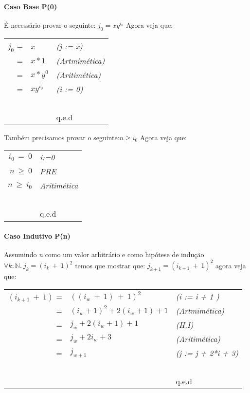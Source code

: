 \paragraph{Caso Base P(0)}
É necessário provar o seguinte: $ j_0 =xy^{i_0} $ Agora veja que:
 \begin{center}
     \begin{tabular}{rll}
         \emph{$j_0$} =& \emph{x} & \emph{(j := x)} \\
                      =& \emph{$x*1$}& \emph{(Artmimética)}\\ 
                      =& \emph{$x*y^0$}& \emph{(Aritimética)}\\        
                      =& \emph{$xy^{i_0}$}& \emph{(i := 0)}\\ 
         ~&~&~\\
         ~&~&q.e.d\\
     \end{tabular}
 \end{center}
Também precisamos provar o seguinte:$n \geq i_0$ Agora veja que:
 \begin{center}
     \begin{tabular}{rl}
         \emph{$i_0\ =\ 0$}& \emph{i:=0} \\
         \emph{$n\ \geq\ 0$}& \emph{PRE} \\
         \emph{$n\ \geq\ i_0$}& \emph{Aritimética} \\
         ~&~\\
         ~&q.e.d\\
     \end{tabular}
 \end{center}

\paragraph{Caso Indutivo P(n)}
Assumindo \emph{n} como um valor arbitrário e como hipótese de indução
$\forall k :\mathbb{N} .\ j_k=(i_k\ +\ 1)^2$ temos que mostrar que: 
$j_{k+1}=(i_{k+1}\ +\ 1)^2$ agora veja que:
 \begin{center}
     \begin{tabular}{rll}
         \emph{$(i_{k+1}\ +\ 1)$} =& \emph{$((i_w\ +\ 1)\ +\ 1)^2$} & \emph{(i := i + 1 )} \\
                                  =& \emph{$(i_w + 1)^2 + 2(i_w +1) + 1$}& \emph{(Artmimética)}\\ 
                                  =& \emph{$j_w + 2(i_w + 1) + 1$}& \emph{(H.I)}\\        
                                  =& \emph{$j_w + 2i_w + 3$}& \emph{(Aritimética)}\\ 
         =& \emph{$j_{w+1} $}& \emph{(j := j + 2*i + 3)}\\ 
         ~&~&~\\
         ~&~&q.e.d\\
     \end{tabular}
 \end{center}

